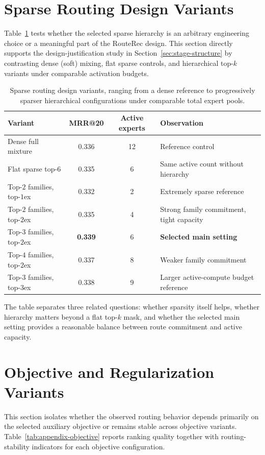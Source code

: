 \documentclass[sigconf,review,anonymous]{acmart}
\begin{document}
\section{Sparse Routing Design Variants}
\label{app:sparse-design}
Table~\ref{tab:appendix-sparse-design} tests whether the selected sparse hierarchy is an arbitrary engineering choice or a meaningful part of the RouteRec design. This section directly supports the design-justification study in Section~\ref{sec:stage-structure} by contrasting dense (soft) mixing, flat sparse controls, and hierarchical top-$k$ variants under comparable activation budgets.

\begin{table}[H]
  \centering
  \caption{Sparse routing design variants, ranging from a dense reference to progressively sparser hierarchical configurations under comparable total expert pools.}
  \label{tab:appendix-sparse-design}
  \footnotesize
  \setlength{\tabcolsep}{4pt}
  \begin{tabularx}{\columnwidth}{@{}>{\raggedright\arraybackslash}Xcc>{\raggedright\arraybackslash}X@{}}
    \toprule
    Variant & MRR@20 & Active experts & Observation \\
    \midrule
    Dense full mixture & 0.336 & 12 & Reference control \\
    Flat sparse top-$6$ & 0.335 & 6 & Same active count without hierarchy \\
    Top-$2$ families, top-$1$ex & 0.332 & 2 & Extremely sparse reference \\
    Top-$2$ families, top-$2$ex & 0.335 & 4 & Strong family commitment, tight capacity \\
    Top-$3$ families, top-$2$ex & \textbf{0.339} & 6 & \textbf{Selected main setting} \\
    Top-$4$ families, top-$2$ex & 0.337 & 8 & Weaker family commitment \\
    Top-$3$ families, top-$3$ex & 0.338 & 9 & Larger active-compute budget reference \\
    \bottomrule
  \end{tabularx}
\end{table}

The table separates three related questions: whether sparsity itself helps, whether hierarchy matters beyond a flat top-$k$ mask, and whether the selected main setting provides a reasonable balance between route commitment and active capacity.

\section{Objective and Regularization Variants}
\label{app:objective}
This section isolates whether the observed routing behavior depends primarily on the selected auxiliary objective or remains stable across objective variants. Table~\ref{tab:appendix-objective} reports ranking quality together with routing-stability indicators for each objective configuration.
\end{document}

